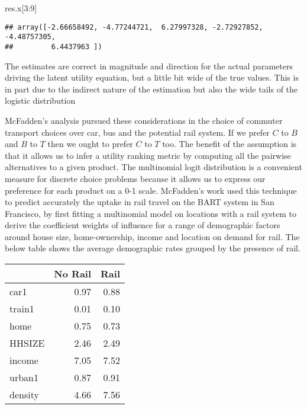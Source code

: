 \documentclass[]{tufte-book}
\newenvironment{Shaded}{}{}
\newcommand{\DecValTok}[1]{\textcolor[rgb]{0.25,0.63,0.44}{#1}}
\newcommand{\NormalTok}[1]{#1}
\theoremstyle{definition}
\theoremstyle{definition}
\theoremstyle{definition}
\theoremstyle{remark}
\begin{document}
\begin{Shaded}
\begin{Highlighting}[]
\NormalTok{res.x[}\DecValTok{3}\NormalTok{:}\DecValTok{9}\NormalTok{]}
\end{Highlighting}
\end{Shaded}

\begin{verbatim}
## array([-2.66658492, -4.77244721,  6.27997328, -2.72927852, -4.48757305,
##         6.4437963 ])
\end{verbatim}

The estimates are correct in magnitude and direction for the actual parameters driving the latent utility equation, but a little bit wide of the true values. This is in part due to the indirect nature of the estimation but also the wide tails of the logistic distribution

McFadden's analysis pursued these considerations in the choice of commuter transport choices over car, bus and the potential rail system. If we prefer \(C\) to \(B\) and \(B\) to \(T\) then we ought to prefer \(C\) to \(T\) too. The benefit of the assumption is that it allows us to infer a utility ranking metric by computing all the pairwise alternatives to a given product. The multinomial logit distribution is a convenient measure for discrete choice problems because it allows us to express our preference for each product on a 0-1 scale. McFadden's work used this technique to predict accurately the uptake in rail travel on the BART system in San Francisco, by first fitting a multinomial model on locations with a rail system to derive the coefficient weights of influence for a range of demographic factors around house size, home-ownership, income and location on demand for rail. The below table shows the average demographic rates grouped by the presence of rail.

\begin{tabular}{l|r|r}
\hline
  & No Rail & Rail\\
\hline
car1 & 0.97 & 0.88\\
\hline
train1 & 0.01 & 0.10\\
\hline
home & 0.75 & 0.73\\
\hline
HHSIZE & 2.46 & 2.49\\
\hline
income & 7.05 & 7.52\\
\hline
urban1 & 0.87 & 0.91\\
\hline
density & 4.66 & 7.56\\
\hline
\end{tabular}
\end{document}
